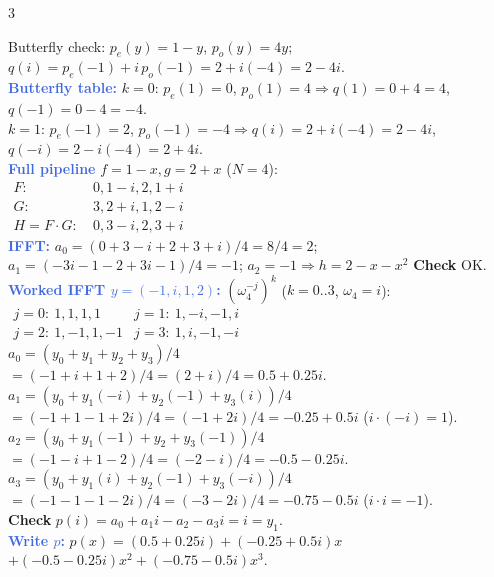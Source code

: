 \documentclass[9pt]{extarticle}
\newcommand{\hl}[1]{\textbf{\textcolor{BrickRed}{#1}}}
\newcommand{\wk}[1]{\textbf{\textcolor{OliveGreen}{#1}}}
\newcommand{\ex}[1]{\textbf{\textcolor{RoyalBlue}{#1}}}
\begin{document}
\begin{multicols}{3}
\begin{sloppypar}
Butterfly check: $p_e(y){=}1{-}y$, $p_o(y){=}4y$; $q(i){=}p_e({-}1){+}i\,p_o({-}1){=}2{+}i({-}4){=}2{-}4i$.\\
\ex{Butterfly table:} $k{=}0$: $p_e(1){=}0$, $p_o(1){=}4\Rightarrow q(1){=}0{+}4{=}4$, $q({-}1){=}0{-}4{=}{-}4$.\\
$k{=}1$: $p_e({-}1){=}2$, $p_o({-}1){=}{-}4\Rightarrow q(i){=}2{+}i({-}4){=}2{-}4i$, $q({-}i){=}2{-}i({-}4){=}2{+}4i$.\\
\ex{Full pipeline} $f{=}1{-}x,g{=}2{+}x$ ($N{=}4$):\\
$\begin{array}{rcl}
F{:}\ &0,1{-}i,2,1{+}i\\
G{:}\ &3,2{+}i,1,2{-}i\\
H{=}F{\cdot}G{:}\ &0,3{-}i,2,3{+}i
\end{array}$\\
\ex{IFFT:} $a_0{=}(0{+}3{-}i{+}2{+}3{+}i)/4{=}8/4{=}2$; $a_1{=}({-}3i{-}1{-}2{+}3i{-}1)/4{=}{-}1$; $a_2{=}{-}1\Rightarrow$\hl{$h{=}2{-}x{-}x^2$} \wk{Check} OK.\\
\ex{Worked IFFT $y{=}({-}1,i,1,2)$:} $(\omega_4^{-j})^k$ ($k{=}0..3$, $\omega_4{=}i$):\\
$\begin{array}{ll}
j{=}0:\ 1,1,1,1 & j{=}1:\ 1,{-}i,{-}1,i\\
j{=}2:\ 1,{-}1,1,{-}1 & j{=}3:\ 1,i,{-}1,{-}i
\end{array}$\\
$a_0{=}(y_0{+}y_1{+}y_2{+}y_3)/4$\\
${=}({-}1{+}i{+}1{+}2)/4{=}(2{+}i)/4{=}0.5{+}0.25i$.\\
$a_1{=}(y_0{+}y_1({-}i){+}y_2({-}1){+}y_3(i))/4$\\
${=}({-}1{+}1{-}1{+}2i)/4{=}({-}1{+}2i)/4{=}{-}0.25{+}0.5i$ ($i{\cdot}({-}i){=}1$).\\
$a_2{=}(y_0{+}y_1({-}1){+}y_2{+}y_3({-}1))/4$\\
${=}({-}1{-}i{+}1{-}2)/4{=}({-}2{-}i)/4{=}{-}0.5{-}0.25i$.\\
$a_3{=}(y_0{+}y_1(i){+}y_2({-}1){+}y_3({-}i))/4$\\
${=}({-}1{-}1{-}1{-}2i)/4{=}({-}3{-}2i)/4{=}{-}0.75{-}0.5i$ ($i{\cdot}i{=}{-}1$).\\
\wk{Check} $p(i){=}a_0{+}a_1i{-}a_2{-}a_3i{=}i{=}y_1$.\\
\ex{Write $p$:} $p(x){=}(0.5{+}0.25i){+}({-}0.25{+}0.5i)x$\\
${+}({-}0.5{-}0.25i)x^2{+}({-}0.75{-}0.5i)x^3$.
\end{sloppypar}


\end{multicols}
\end{document}

